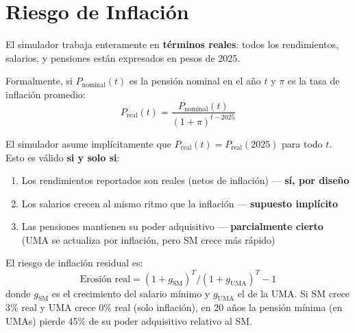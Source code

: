 \documentclass[11pt,a4paper]{report}
\begin{document}
\section{Riesgo de Inflaci\'on}

\begin{tcolorbox}[colback=blue!5!white, colframe=blue!75!black, title=\textbf{Definici\'on Formal: Valores Reales vs.\ Nominales}]
El simulador trabaja enteramente en \textbf{t\'erminos reales}: todos los rendimientos, salarios, y pensiones est\'an expresados en pesos de 2025.

Formalmente, si $P_{\text{nominal}}(t)$ es la pensi\'on nominal en el a\~no $t$ y $\pi$ es la tasa de inflaci\'on promedio:
\[
  P_{\text{real}}(t) = \frac{P_{\text{nominal}}(t)}{(1 + \pi)^{t-2025}}
\]

El simulador asume impl\'icitamente que $P_{\text{real}}(t) = P_{\text{real}}(2025)$ para todo $t$. Esto es v\'alido \textbf{si y solo si}:
\begin{enumerate}
  \item Los rendimientos reportados son reales (netos de inflaci\'on) --- \textbf{s\'i, por dise\~no}
  \item Los salarios crecen al mismo ritmo que la inflaci\'on --- \textbf{supuesto impl\'icito}
  \item Las pensiones mantienen su poder adquisitivo --- \textbf{parcialmente cierto} (UMA se actualiza por inflaci\'on, pero SM crece m\'as r\'apido)
\end{enumerate}

El riesgo de inflaci\'on residual es:
\[
  \text{Erosi\'on real} = (1 + g_{\text{SM}})^T / (1 + g_{\text{UMA}})^T - 1
\]
donde $g_{\text{SM}}$ es el crecimiento del salario m\'inimo y $g_{\text{UMA}}$ el de la UMA. Si SM crece 3\% real y UMA crece 0\% real (solo inflaci\'on), en 20 a\~nos la pensi\'on m\'inima (en UMAs) pierde 45\% de su poder adquisitivo relativo al SM.
\end{tcolorbox}
\end{document}
